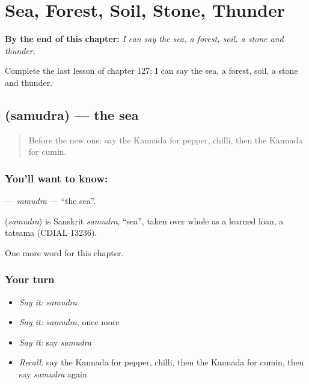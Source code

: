 
\chapter{Sea, Forest, Soil, Stone, Thunder}
\label{ch:ka-sea-forest-soil-stone-thunder}

\begin{chapteropening}
\textbf{By the end of this chapter:} \emph{I can say the sea, a forest, soil, a stone and thunder.}

Complete the last lesson of chapter 127: I can say the sea, a forest, soil, a stone and thunder.
\end{chapteropening}

\section[\texorpdfstring{\kn{ಸಮುದ್ರ} (samudra)}{ಸಮುದ್ರ (samudra)}]{ (samudra) — the sea}

\label{lesson:KA-C127-samudra}



\begin{quote}
Before the new one: say the Kannada for pepper, chilli, then the Kannada for cumin.
\end{quote}

\subsection*{You'll want to know: }
\textbf{} — \emph{samudra} — \textquotedblleft{}the sea\textquotedblright{}.

\begin{cousinweb}
\textbf{} (\emph{samudra}) is Sanskrit \emph{samudra}, \textquotedblleft{}sea\textquotedblright{}, taken over whole as a learned loan, a tatsama (CDIAL 13236).
\end{cousinweb}

\begin{grammarlens}[title={What you've built}]
One more word for this chapter.
\end{grammarlens}

\subsection*{Your turn}
\begin{itemize}
\raggedright
  \item \emph{Say it:} \emph{samudra}
  \item \emph{Say it:} \emph{samudra}, once more
  \item \emph{Say it:} say \emph{samudra}
  \item \emph{Recall:} say the Kannada for pepper, chilli, then the Kannada for cumin, then say \emph{samudra} again
\end{itemize}

